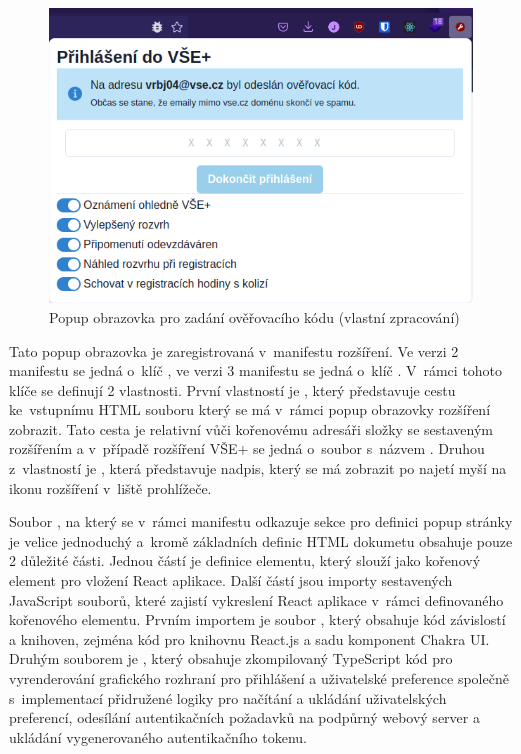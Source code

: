 \begin{figure}[H]\centering
    \includegraphics[width=\textwidth]{img/prihlaseni-vse-plus-kod.png}
    \caption{Popup obrazovka pro zadání ověřovacího kódu (vlastní zpracování)}
    \label{fig:prihlaseni-2}
\end{figure}

Tato popup obrazovka je zaregistrovaná v~manifestu rozšíření. Ve verzi 2 manifestu se jedná o~klíč , ve verzi 3 manifestu se jedná o~klíč . V~rámci tohoto klíče se definují 2 vlastnosti. První vlastností je , který představuje cestu ke~vstupnímu HTML souboru který se má v~rámci popup obrazovky rozšíření zobrazit. Tato cesta je relativní vůči kořenovému adresáři složky se sestaveným rozšířením a v~případě rozšíření VŠE+ se jedná o~soubor s~názvem . Druhou z~vlastností je , která představuje nadpis, který se má zobrazit po najetí myší na ikonu rozšíření v~liště prohlížeče.

Soubor , na který se v~rámci manifestu odkazuje sekce pro definici popup stránky je velice jednoduchý a~kromě základních definic HTML dokumetu obsahuje pouze 2 důležité části. Jednou částí je definice  elementu, který slouží jako kořenový element pro vložení React aplikace. Další částí jsou importy sestavených JavaScript souborů, které zajistí vykreslení React aplikace v~rámci definovaného kořenového elementu. Prvním importem je soubor , který obsahuje kód závislostí a knihoven, zejména kód pro knihovnu React.js a sadu komponent Chakra UI. Druhým souborem je , který obsahuje zkompilovaný TypeScript kód pro vyrenderování grafického rozhraní pro přihlášení a uživatelské preference společně s~implementací přidružené logiky pro načítání a ukládání uživatelských preferencí, odesílání autentikačních požadavků na podpůrný webový server a ukládání vygenerovaného autentikačního tokenu.

